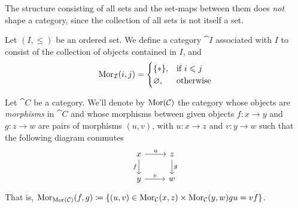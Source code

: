 \begin{remark}
The structure consisting of all sets and the set-maps between them does
\emph{not} shape a category, since the collection of all sets is not itself a
set.
\end{remark}

\begin{example}
\label{exp:order-category}
Let \((I, \leq)\) be an ordered set. We define a category \(\cat I\)
associated with \(I\) to consist of the collection of objects contained in
\(I\), and
\[
  \operatorname{Mor}_{\mathcal I}(i, j) =
  \begin{cases}
    \{*\}, &\text{if } i \leqslant j \\
    \varnothing, &\text{otherwise}
  \end{cases}
\]
\end{example}

\begin{definition}
\label{def:morphism-category}
Let \(\cat C\) be a category. We'll denote by \(\operatorname{Mor}(\mathcal C)\) the category
whose objects are \emph{morphisms} in \(\cat C\) and whose morphisms between
given objects \(f: x \to y\) and \(g: z \to w\) are pairs of morphisms \((u,
v)\), with \(u: x \to z\) and \(v: y \to w\) such that the following diagram
commutes
\[
  \begin{tikzcd}
    x \ar[d, swap, "f"] \ar[r, "u"] &z \ar[d, "g"] \\
    y \ar[r, "v"] &w
  \end{tikzcd}
\]
That is, \(\operatorname{Mor}_{\operatorname{Mor}(\mathcal C)}(f, g) \coloneq \{(u, v) \in \operatorname{Mor}_{\mathcal C}(x, z)
\times \operatorname{Mor}_{\mathcal C}(y, w) \relax g u = v f\}\).
\end{definition}

